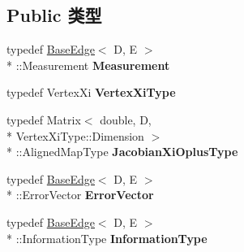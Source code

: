 \subsection*{Public 类型}
\begin{DoxyCompactItemize}
\item 
\hypertarget{classg2o_1_1BaseUnaryEdge_ab953b076b4c35fcf99de02bd0bfcc1ae}{typedef \hyperlink{classg2o_1_1BaseEdge}{Base\-Edge}$<$ D, E $>$\\*
\-::Measurement {\bfseries Measurement}}\label{classg2o_1_1BaseUnaryEdge_ab953b076b4c35fcf99de02bd0bfcc1ae}

\item 
\hypertarget{classg2o_1_1BaseUnaryEdge_a503e62e74775172c008135650850d511}{typedef Vertex\-Xi {\bfseries Vertex\-Xi\-Type}}\label{classg2o_1_1BaseUnaryEdge_a503e62e74775172c008135650850d511}

\item 
\hypertarget{classg2o_1_1BaseUnaryEdge_a24bcabd661223e15b7337f2835310f5e}{typedef Matrix$<$ double, D, \\*
Vertex\-Xi\-Type\-::\-Dimension $>$\\*
\-::Aligned\-Map\-Type {\bfseries Jacobian\-Xi\-Oplus\-Type}}\label{classg2o_1_1BaseUnaryEdge_a24bcabd661223e15b7337f2835310f5e}

\item 
\hypertarget{classg2o_1_1BaseUnaryEdge_abc04cfacb65fc72825156f1b3346dd48}{typedef \hyperlink{classg2o_1_1BaseEdge}{Base\-Edge}$<$ D, E $>$\\*
\-::Error\-Vector {\bfseries Error\-Vector}}\label{classg2o_1_1BaseUnaryEdge_abc04cfacb65fc72825156f1b3346dd48}

\item 
\hypertarget{classg2o_1_1BaseUnaryEdge_a6753caa95c30fa5bb3887e2a30892ff3}{typedef \hyperlink{classg2o_1_1BaseEdge}{Base\-Edge}$<$ D, E $>$\\*
\-::Information\-Type {\bfseries Information\-Type}}\label{classg2o_1_1BaseUnaryEdge_a6753caa95c30fa5bb3887e2a30892ff3}

\end{DoxyCompactItemize}
